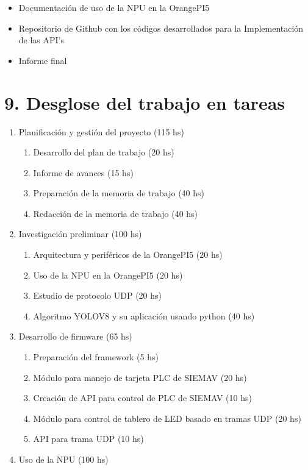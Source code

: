 \documentclass[
11pt, %
]{charter}
\begin{document}
\begin{itemize}
	\item Documentación de uso de la NPU en la OrangePI5
	\item Repositorio de Github con los códigos desarrollados para la Implementación de las API's
	\item Informe final
\end{itemize}



\section{9. Desglose del trabajo en tareas}
\label{sec:wbs}

\begin{enumerate}
\item Planificación y gestión del proyecto (115 hs)
	\begin{enumerate}
	\item Desarrollo del plan de trabajo (20 hs)
	\item Informe de avances (15 hs)
	\item Preparación de la memoria de trabajo (40 hs)
	\item Redacción de la memoria de trabajo (40 hs)
	\end{enumerate}
\item Investigación preliminar (100 hs)
	\begin{enumerate}
	\item Arquitectura y periféricos de la OrangePI5 (20 hs)
	\item Uso de la NPU en la OrangePI5 (20 hs)
	\item Estudio de protocolo UDP (20 hs)
	\item Algoritmo YOLOV8 y su aplicación usando python (40 hs)
	\end{enumerate}
\item Desarrollo de firmware (65 hs)
	\begin{enumerate}
	\item Preparación del framework (5 hs)
	\item Módulo para manejo de tarjeta PLC de SIEMAV (20 hs)
	\item Creación de API para control de PLC de SIEMAV (10 hs)
	\item Módulo para control de tablero de LED basado en tramas UDP (20 hs)
	\item API para trama UDP (10 hs)
	\end{enumerate}
\item Uso de la NPU (100 hs)

\end{enumerate}
\end{document}
